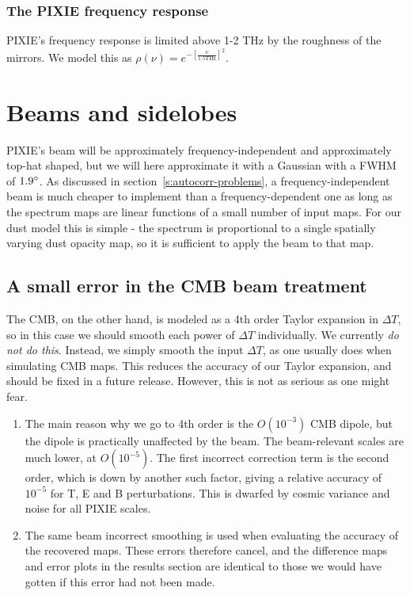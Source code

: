 \documentclass{article}
\begin{document}
\subsubsection{The PIXIE frequency response}
PIXIE's frequency response is limited above 1-2 THz by the roughness of the mirrors.
We model this as $\rho(\nu) = e^{-\left[\frac{\nu}{1.5\textrm{THz}}\right]^2}$.

\section{Beams and sidelobes}
PIXIE's beam will be approximately frequency-independent and approximately
top-hat shaped, but we will here approximate it with a Gaussian
with a FWHM of $1.9\degree$. As discussed in section~\ref{s:autocorr-problems},
a frequency-independent beam is much cheaper to implement than a frequency-dependent
one as long as the spectrum maps are linear functions of a small number of input
maps. For our dust model this is simple - the spectrum is proportional
to a single spatially varying dust opacity map, so it is sufficient to apply the
beam to that map.

\subsection{A small error in the CMB beam treatment}
The CMB, on the other hand, is modeled as a 4th order Taylor
expansion in $\Delta T$, so in this case we should smooth each power of $\Delta T$
individually. We currently \emph{do not do this}. Instead, we simply smooth
the input $\Delta T$, as one usually does when simulating CMB maps. This reduces
the accuracy of our Taylor expansion, and should be fixed in a future release.
However, this is not as serious as one might fear.
\begin{enumerate}
	\item The main reason why we go to 4th order is the $O(10^{-3})$ CMB dipole,
		but the dipole is practically unaffected by the beam. The beam-relevant
		scales are much lower, at $O(10^{-5})$. The first incorrect correction
		term is the second order, which is down by another such factor, giving
		a relative accuracy of $10^{-5}$ for T, E and B perturbations. This is
		dwarfed by cosmic variance and noise for all PIXIE scales.
	\item The same beam incorrect smoothing is used when evaluating the accuracy of the
		recovered maps. These errors therefore cancel, and the difference maps and
		error plots in the results section are identical to those we would have gotten
		if this error had not been made.
\end{enumerate}
\end{document}
